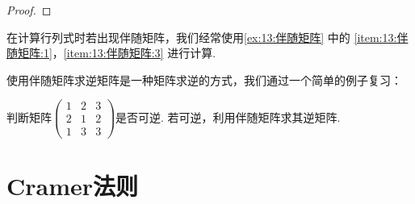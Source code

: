 \begin{proof}

\end{proof}

在计算行列式时若出现伴随矩阵，我们经常使用\autoref{ex:13:伴随矩阵} 中的 \ref*{item:13:伴随矩阵:1}，\ref*{item:13:伴随矩阵:3} 进行计算.

使用伴随矩阵求逆矩阵是一种矩阵求逆的方式，我们通过一个简单的例子复习：
\begin{example}
    判断矩阵$\begin{pmatrix}
            1 & 2 & 3 \\ 2 & 1 & 2 \\ 1 & 3 & 3
        \end{pmatrix}$是否可逆. 若可逆，利用伴随矩阵求其逆矩阵.
\end{example}

\begin{solution}

\end{solution}

\section{Cramer法则}


